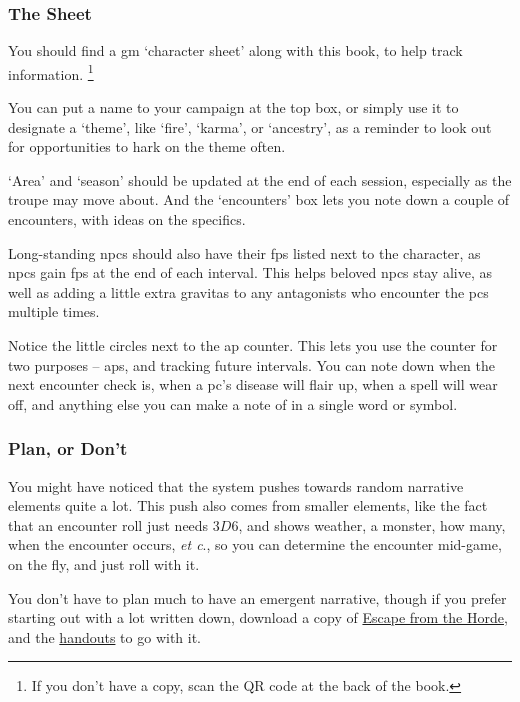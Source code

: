 \begin{multicols}{2}
\subsubsection{The  Sheet}

You should find a \gls{gm} `character sheet' along with this book, to help track information.%
\footnote{If you don't have a copy, scan the QR code at the back of the book.}

You can put a name to your campaign at the top box, or simply use it to designate a `theme', like `fire', `karma', or `ancestry', as a reminder to look out for opportunities to hark on the theme often.

`Area' and `season' should be updated at the end of each session, especially as the troupe may move about.
And the `encounters' box lets you note down a couple of encounters, with ideas on the specifics.

Long-standing \glspl{npc} should also have their \glspl{fp} listed next to the character, as \glspl{npc} gain \glspl{fp} at the end of each \gls{interval}.
This helps beloved \glspl{npc} stay alive, as well as adding a little extra gravitas to any antagonists who encounter the \glspl{pc} multiple times.

Notice the little circles next to the \gls{ap} counter.
This lets you use the counter for two purposes -- \glspl{ap}, and tracking future \glspl{interval}.
You can note down when the next encounter check is, when a \gls{pc}'s disease will flair up, when a spell will wear off, and anything else you can make a note of in a single word or symbol.

\subsubsection{Plan, or Don't}

You might have noticed that the system pushes towards random narrative elements quite a lot.
This push also comes from smaller elements, like the fact that an encounter roll just needs $3D6$, and shows weather, a monster, how many, when the encounter occurs, \textit{et c}., so you can determine the encounter mid-game, on the fly, and just roll with it.

You don't have to plan much to have an emergent narrative, though if you prefer starting out with a lot written down, download a copy of
\href{https://gitlab.com/bindrpg/oneshot/-/jobs/artifacts/master/raw/hardcore_horde_escape.pdf?job=build}{Escape from the Horde}, and the
\href{https://gitlab.com/bindrpg/oneshot/-/jobs/artifacts/master/raw/hardcore_handouts.pdf?job=build}{handouts} to go with it. 


\end{multicols}
